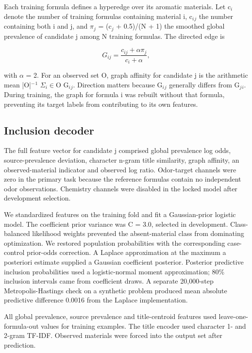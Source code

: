 \documentclass[12pt]{article}
\begin{document}
Each training formula defines a hyperedge over its aromatic materials. Let c\ensuremath{_{i}} denote the number of training formulas containing material i, c\ensuremath{_{i}}\ensuremath{_{j}} the number containing both i and j, and \ensuremath{\pi}\ensuremath{_{j}} = (c\ensuremath{_{j}} + 0.5)/(N + 1) the smoothed global prevalence of candidate j among N training formulas. The directed edge is

\[G_{ij}=\frac{c_{ij}+\alpha\pi_j}{c_i+\alpha},\]

with \ensuremath{\alpha} = 2. For an observed set O, graph affinity for candidate j is the arithmetic mean |O|\ensuremath{{}^{-}}\ensuremath{{}^{1}} \ensuremath{\Sigma}\ensuremath{_{i}}\ensuremath{\in}O G\ensuremath{_{i}}\ensuremath{_{j}}. Direction matters because G\ensuremath{_{i}}\ensuremath{_{j}} generally differs from G\ensuremath{_{j}}\ensuremath{_{i}}. During training, the graph for formula i was rebuilt without that formula, preventing its target labels from contributing to its own features.

\subsection*{Inclusion decoder}

The full feature vector for candidate j comprised global prevalence log odds, source-prevalence deviation, character n-gram title similarity, graph affinity, an observed-material indicator and observed log ratio. Odor-target channels were zero in the primary task because the reference formulas contain no independent odor observations. Chemistry channels were disabled in the locked model after development selection.

We standardized features on the training fold and fit a Gaussian-prior logistic model. The coefficient prior variance was C = 3.0, selected in development. Class-balanced likelihood weights prevented the absent-material class from dominating optimization. We restored population probabilities with the corresponding case-control prior-odds correction. A Laplace approximation at the maximum a posteriori estimate supplied a Gaussian coefficient posterior. Posterior predictive inclusion probabilities used a logistic-normal moment approximation; 80\% inclusion intervals came from coefficient draws. A separate 20,000-step Metropolis-Hastings check on a synthetic problem produced mean absolute predictive difference 0.0016 from the Laplace implementation.

All global prevalence, source prevalence and title-centroid features used leave-one-formula-out values for training examples. The title encoder used character 1- and 2-gram TF-IDF. Observed materials were forced into the output set after prediction.
\end{document}
